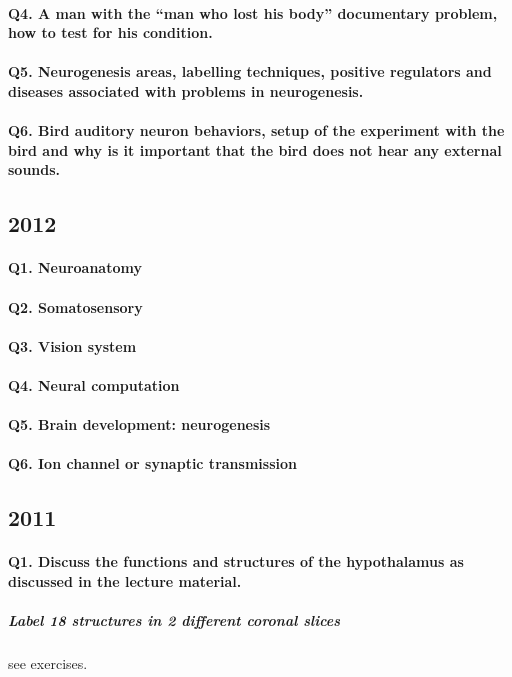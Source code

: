 \documentclass[12pt,article,oneside,a4paper]{memoir}
\begin{document}
\paragraph{Q4. A man with the “man who lost his body” documentary problem, how to test for his condition.}
\paragraph{Q5. Neurogenesis areas, labelling techniques, positive regulators and diseases associated with problems in neurogenesis.}
\paragraph{Q6. Bird auditory neuron behaviors, setup of the experiment with the bird and why is it important that the bird does not hear any external sounds.}

\subsection{2012}
\paragraph{Q1. Neuroanatomy}
\paragraph{Q2. Somatosensory}
\paragraph{Q3. Vision system}
\paragraph{Q4. Neural computation}
\paragraph{Q5. Brain development: neurogenesis}
\paragraph{Q6. Ion channel or synaptic transmission}

\subsection{2011}
\paragraph{Q1. Discuss the functions and structures of the hypothalamus as discussed in the lecture material.}
\subparagraph{Label 18 structures in 2 different coronal slices} see exercises.
\end{document}
